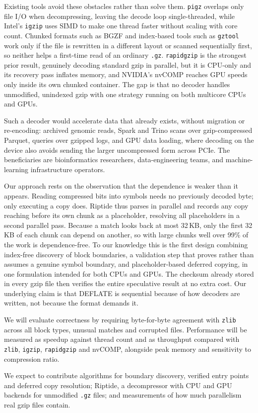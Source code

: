 \documentclass[conference]{IEEEtran}
\begin{document}
Existing tools avoid these obstacles rather than solve them. \texttt{pigz}
overlaps only file I/O when decompressing, leaving the decode loop
single-threaded, while Intel's \texttt{igzip} uses SIMD to make one thread
faster without scaling with core count. Chunked formats such as BGZF and
index-based tools such as \texttt{gztool} work only if the file is rewritten in
a different layout or scanned sequentially first, so neither helps a first-time
read of an ordinary \texttt{.gz}. \texttt{rapidgzip} is the strongest prior
result, genuinely decoding standard gzip in parallel, but it is CPU-only and
its recovery pass inflates memory, and NVIDIA's nvCOMP reaches GPU speeds only
inside its own chunked container. The gap is that no decoder handles
unmodified, unindexed gzip with one strategy running on both multicore CPUs and
GPUs.

Such a decoder would accelerate data that already exists, without migration or
re-encoding: archived genomic reads, Spark and Trino scans over
gzip-compressed Parquet, queries over gzipped logs, and GPU data loading, where
decoding on the device also avoids sending the larger uncompressed form across
PCIe. The beneficiaries are bioinformatics researchers, data-engineering teams,
and machine-learning infrastructure operators.

Our approach rests on the observation that the dependence is weaker than it
appears. Reading compressed bits into symbols needs no previously decoded byte;
only executing a copy does. Riptide thus parses in parallel and records any
copy reaching before its own chunk as a placeholder, resolving all placeholders
in a second parallel pass. Because a match looks back at most 32\,KB, only the
first 32\,KB of each chunk can depend on another, so with large chunks well
over 99\% of the work is dependence-free. To our knowledge this is the first
design combining index-free discovery of block boundaries, a validation step
that proves rather than assumes a genuine symbol boundary, and
placeholder-based deferred copying, in one formulation intended for both CPUs
and GPUs. The checksum already stored in every gzip file then verifies the
entire speculative result at no extra cost. Our underlying claim is that
DEFLATE is sequential because of how decoders are written, not because the
format demands it.

We will evaluate correctness by requiring byte-for-byte agreement with
\texttt{zlib} across all block types, unusual matches and corrupted files.
Performance will be measured as speedup against thread count and as throughput
compared with \texttt{zlib}, \texttt{igzip}, \texttt{rapidgzip} and nvCOMP,
alongside peak memory and sensitivity to compression ratio.

We expect to contribute algorithms for boundary discovery, verified entry
points and deferred copy resolution; Riptide, a decompressor with CPU and GPU
backends for unmodified \texttt{.gz} files; and measurements of how much
parallelism real gzip files contain.
\end{document}
